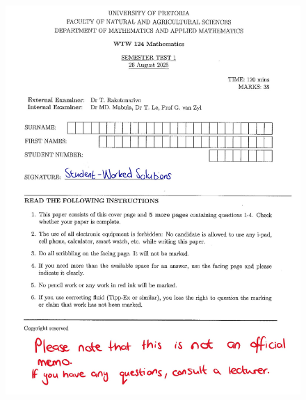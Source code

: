 \documentclass[11pt]{article}
\begin{document}
\begin{figure}[!ht]
    \centering
    \includegraphics[width=1\textwidth]{TitleMemo.jpg}
\end{figure}

\newpage
\end{document}

